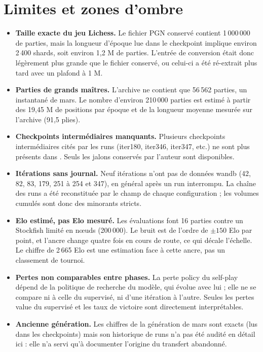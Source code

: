 \section{Limites et zones d'ombre}

\begin{itemize}[leftmargin=1.2em,itemsep=3pt,topsep=2pt]
  \item \textbf{Taille exacte du jeu Lichess.} Le fichier PGN conservé
        contient 1\,000\,000 de parties, mais la longueur d'époque lue dans le
        checkpoint implique environ 2\,400 shards, soit environ 1,2 M de
        parties. L'entrée de conversion était donc légèrement plus grande que
        le fichier conservé, ou celui-ci a été ré-extrait plus tard avec un
        plafond à 1 M.

  \item \textbf{Parties de grands maîtres.} L'archive
         ne contient que 56\,562 parties, un
        instantané de mars. Le nombre d'environ 210\,000 parties est estimé à
        partir des 19,45 M de positions par époque et de la longueur moyenne
        mesurée sur l'archive (91,5 plies).

  \item \textbf{Checkpoints intermédiaires manquants.} Plusieurs checkpoints
        intermédiaires cités par les runs (iter180, iter346, iter347, etc.) ne
        sont plus présents dans . Seuls les
        jalons conservés par l'auteur sont disponibles.

  \item \textbf{Itérations sans journal.} Neuf itérations n'ont pas de
        données wandb (42, 82, 83, 179, 251 à 254 et 347), en général après un
        run interrompu. La chaîne des runs a été reconstituée par le champ
         de chaque configuration ; les volumes cumulés
        sont donc des minorants stricts.

  \item \textbf{Elo estimé, pas Elo mesuré.} Les évaluations font 16 parties
        contre un Stockfish limité en nœuds (200\,000). Le bruit est de
        l'ordre de $\pm 150$ Elo par point, et l'ancre change quatre fois en
        cours de route, ce qui décale l'échelle. Le chiffre de 2\,665 Elo est
        une estimation face à cette ancre, pas un classement de tournoi.

  \item \textbf{Pertes non comparables entre phases.} La perte policy du
        self-play dépend de la politique de recherche du modèle, qui évolue
        avec lui ; elle ne se compare ni à celle du supervisé, ni d'une
        itération à l'autre. Seules les pertes value du supervisé et les
        taux de victoire sont directement interprétables.

  \item \textbf{Ancienne génération.} Les chiffres de la génération de mars
        sont exacts (lus dans les checkpoints) mais son historique de runs
        n'a pas été audité en détail ici : elle n'a servi qu'à documenter
        l'origine du transfert abandonné.
\end{itemize}
